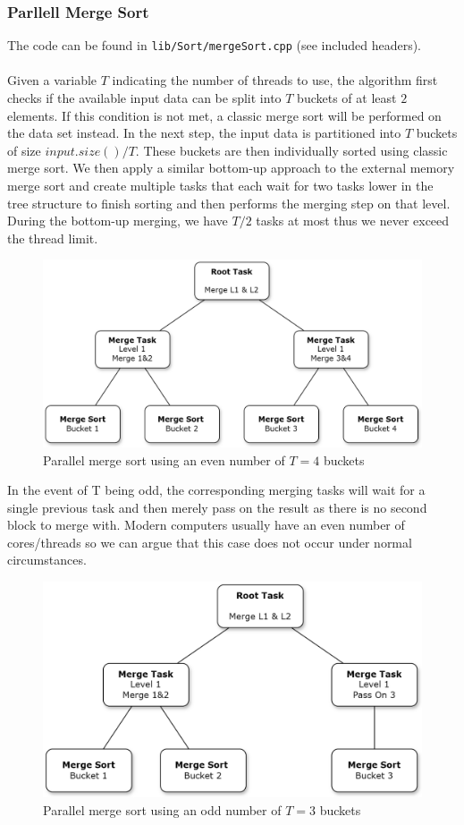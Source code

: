 \documentclass[twocolumn]{article}
\begin{document}
\subsubsection{Parllell Merge Sort}
The code can be found in \texttt{lib/Sort/mergeSort.cpp} (see included headers).\\
\\
Given a variable $T$ indicating the number of threads to use, the algorithm first checks if the available input data can be split into $T$ buckets of at least $2$ elements. 
If this condition is not met, a classic merge sort will be performed on the data set instead.
In the next step, the input data is partitioned into $T$ buckets of size $input.size()/T$.  
These buckets are then individually sorted using classic merge sort. 
We then apply a similar bottom-up approach to the external memory merge sort and create multiple tasks that each wait for two tasks lower in the tree structure to finish sorting and then performs the merging step on that level. 
During the bottom-up merging, we have $T/2$ tasks at most thus we never exceed the thread limit.
\begin{figure}[h]
    \includegraphics[scale=0.175]{./figures/merge_sort_even.drawio.png}
    \centering
    \caption{Parallel merge sort using an even number of $T=4$ buckets}
    \end{figure}
In the event of T being odd, the corresponding merging tasks will wait for a single previous task and then merely pass on the result as there is no second block to merge with. 
Modern computers usually have an even number of cores/threads so we can argue that this case does not occur under normal circumstances.
\begin{figure}[h]
\includegraphics[scale=0.175]{./figures/merge_sort_odd.drawio.png}
\centering
\caption{Parallel merge sort using an odd number of $T=3$ buckets}
\end{figure}
\end{document}
